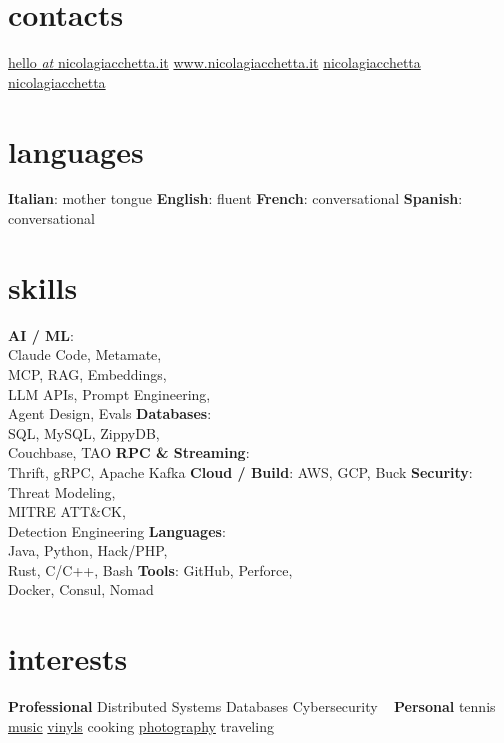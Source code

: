 \begin{aside} %
\section{\normalfont contacts}
\myNumberUK
\href{mailto:\myEmail}{hello {\emph{at}} nicolagiacchetta.it}
\href{http://www.nicolagiacchetta.it/}{www.nicolagiacchetta.it}
 \hspace{0.02cm} \href{https://github.com/nicolagiacchetta}{ nicolagiacchetta}
 \hspace{0.02cm} \href{https://www.linkedin.com/in/nicolagiacchetta}{ nicolagiacchetta}
~
\vspace{-0.1cm}
\section{\normalfont languages}
\textbf{Italian}: mother tongue
\textbf{English}: fluent
\textbf{French}: conversational
\textbf{Spanish}: conversational
~
\vspace{-0.1cm}
\section{\normalfont skills}
\textbf{AI / ML}:\\ Claude Code, Metamate,\\ MCP, RAG, Embeddings,\\ LLM APIs, Prompt Engineering,\\ Agent Design, Evals
\textbf{Databases}:\\ SQL, MySQL, ZippyDB,\\ Couchbase, TAO
\textbf{RPC \& Streaming}:\\ Thrift, gRPC, Apache Kafka
\textbf{Cloud / Build}: AWS, GCP, Buck
\textbf{Security}:\\ Threat Modeling,\\ MITRE ATT\&CK,\\ Detection Engineering
\textbf{Languages}:\\ Java, Python, Hack/PHP,\\ Rust, C/C++, Bash
\textbf{Tools}: GitHub, Perforce,\\ Docker, Consul, Nomad
~
\vspace{-0.1cm}
\section{\normalfont interests}
\textbf{Professional}
Distributed Systems
Databases
Cybersecurity
~
\vspace{-0.1cm}
\textbf{Personal}
tennis
\href{https://open.spotify.com/user/1171479957}{music}
\href{https://www.discogs.com/user/little_jacket/collection}{vinyls}
cooking
\href{https://www.flickr.com/photos/nicolagiacchetta}{photography}
traveling
~
\end{aside}

